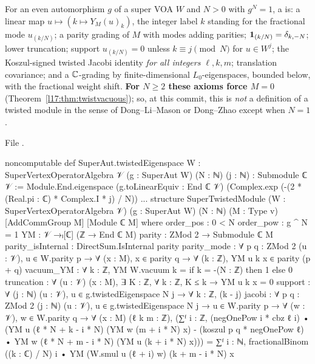 \begin{definition}\label{l17:def:supertwisted}
For an even automorphism $g$ of a super VOA $W$ and $N>0$ with $g^N=1$, a 
is: a linear map $u\mapsto(k\mapsto Y_M(u)_k)$, the integer label $k$ standing for the fractional
mode $u_{(k/N)}$; a parity grading of $M$ with modes adding parities; $\mathbf{1}_{(k/N)}=\delta_{k,-N}$;
lower truncation; support $u_{(k/N)}=0$ unless $k\equiv j\pmod N$ for $u\in W^j$; the Koszul-signed
twisted Jacobi identity \emph{for all integers $\ell,k,m$}; translation covariance; and a
${\mathbb{C}}$-grading by finite-dimensional $L_0$-eigenspaces, bounded below, with the fractional weight shift.
\textbf{For $N\ge2$ these axioms force $M=0$} (Theorem~\ref{l17:thm:twistvacuous}); so, at this
commit, this is \emph{not} a definition of a twisted module in the sense of Dong--Li--Mason or
Dong--Zhao except when $N=1$.
\end{definition}
\noindent File .
\begin{leancode}
noncomputable def SuperAut.twistedEigenspace {W : SuperVertexOperatorAlgebra 𝒱}
    (g : SuperAut W) (N : ℕ) (j : ℕ) : Submodule ℂ 𝒱 :=
  Module.End.eigenspace (g.toLinearEquiv : End ℂ 𝒱)
    (Complex.exp (-(2 * (Real.pi : ℂ) * Complex.I * j) / N))
...
structure SuperTwistedModule (W : SuperVertexOperatorAlgebra 𝒱) (g : SuperAut W)
    (N : ℕ) (M : Type v) [AddCommGroup M] [Module ℂ M] where
  order_pos : 0 < N
  order_pow : g ^ N = 1
  YM : 𝒱 →ₗ[ℂ] (ℤ → End ℂ M)
  parity : ZMod 2 → Submodule ℂ M
  parity_isInternal : DirectSum.IsInternal parity
  parity_mode : ∀ {p q : ZMod 2} (u : 𝒱), u ∈ W.parity p →
    ∀ (x : M), x ∈ parity q → ∀ (k : ℤ), YM u k x ∈ parity (p + q)
  vacuum_YM : ∀ k : ℤ, YM W.vacuum k = if k = -(N : ℤ) then 1 else 0
  truncation : ∀ (u : 𝒱) (x : M), ∃ K : ℤ, ∀ k : ℤ, K ≤ k → YM u k x = 0
  support : ∀ (j : ℕ) (u : 𝒱), u ∈ g.twistedEigenspace N j →
    ∀ k : ℤ, (k - j) %
  jacobi : ∀ {p q : ZMod 2} (j : ℕ) (u : 𝒱),
    u ∈ g.twistedEigenspace N j → u ∈ W.parity p →
    ∀ (w : 𝒱), w ∈ W.parity q → ∀ (x : M) (ℓ k m : ℤ),
    (∑ᶠ i : ℤ, (negOnePow i * cbz ℓ i) •
        (YM u (ℓ * N + k - i * N) (YM w (m + i * N) x)
          - (koszul p q * negOnePow ℓ) •
            YM w (ℓ * N + m - i * N) (YM u (k + i * N) x))) =
      ∑ᶠ i : ℕ, fractionalBinom ((k : ℂ) / N) i •
        YM (W.smul u (ℓ + i) w) (k + m - i * N) x
\end{leancode}
